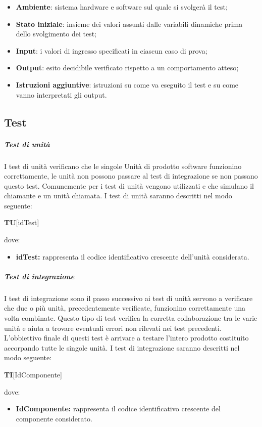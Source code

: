 \begin{itemize}
	\item \textbf{Ambiente}: sistema hardware e software sul quale si svolgerà il test;
	\item \textbf{Stato iniziale}: insieme dei valori assunti dalle variabili dinamiche prima dello svolgimento dei test;
	\item \textbf{Input}: i valori di ingresso specificati in ciascun caso di prova;
	\item \textbf{Output}: esito decidibile verificato rispetto a un comportamento atteso;
	\item \textbf{Istruzioni aggiuntive}: istruzioni su come va eseguito il test e su come vanno interpretati gli output.
\end{itemize}
\subsection{Test}
\subparagraph{Test di unità} \Spazio
I test di unità verificano che le singole Unità di prodotto software funzionino correttamente, le unità non possono passare al test di integrazione se non passano questo test.
Comunemente per i test di unità vengono utilizzati  e  che simulano il chiamante e un unità chiamata.\newline
I test di unità saranno descritti nel modo seguente: \Spazio

\centerline{\textbf{TU}[idTest]}

dove:
\begin{itemize}
	\item \textbf{idTest:} rappresenta il codice identificativo crescente dell’unità considerata.
\end{itemize}
\subparagraph{Test di integrazione} \Spazio
I test di integrazione sono il passo successivo ai test di unità servono a verificare che due o più unità, precedentemente verificate, funzionino correttamente una volta combinate.
Questo tipo di test verifica la corretta collaborazione tra le varie unità e aiuta a trovare eventuali errori non rilevati nei test precedenti.
L'obbiettivo finale di questi test è arrivare a testare l'intero prodotto costituito accorpando tutte le singole unità.\newline
I test di integrazione saranno descritti nel modo seguente: \Spazio
\centerline{\textbf{TI}[IdComponente]}

dove:
\begin{itemize}
	\item \textbf{IdComponente:} rappresenta il codice identificativo crescente del componente considerato.
\end{itemize}

